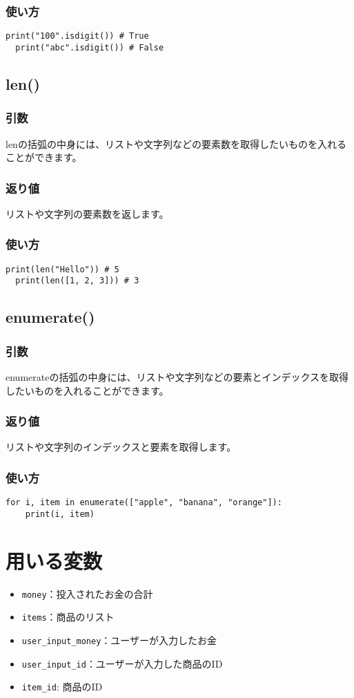 \documentclass[a4paper,titlepage,dvipdfmx]{jarticle}
\begin{document}
\subsubsection*{使い方}
\begin{lstlisting}[caption=isdigit()の使い方, label=isdigit()]
  print("100".isdigit()) # True
  print("abc".isdigit()) # False
\end{lstlisting}

\subsection*{len()}
\subsubsection*{引数}
lenの括弧の中身には、リストや文字列などの要素数を取得したいものを入れることができます。
\subsubsection*{返り値}
リストや文字列の要素数を返します。
\subsubsection*{使い方}
\begin{lstlisting}[caption=len()の使い方, label=len()]
  print(len("Hello")) # 5
  print(len([1, 2, 3])) # 3
\end{lstlisting}

\subsection*{enumerate()}
\subsubsection*{引数}
enumerateの括弧の中身には、リストや文字列などの要素とインデックスを取得したいものを入れることができます。
\subsubsection*{返り値}
リストや文字列のインデックスと要素を取得します。
\subsubsection*{使い方}
\begin{lstlisting}[caption=enumerate()の使い方, label=enumerate()]
  for i, item in enumerate(["apple", "banana", "orange"]):
    print(i, item)
\end{lstlisting}



\section{用いる変数}
\begin{itemize}
  \item \texttt{money}：投入されたお金の合計
  \item \texttt{items}：商品のリスト
  \item \texttt{user\_input\_money}：ユーザーが入力したお金
  \item \texttt{user\_input\_id}：ユーザーが入力した商品のID
  \item \texttt{item\_id}: 商品のID
\end{itemize}
\end{document}
